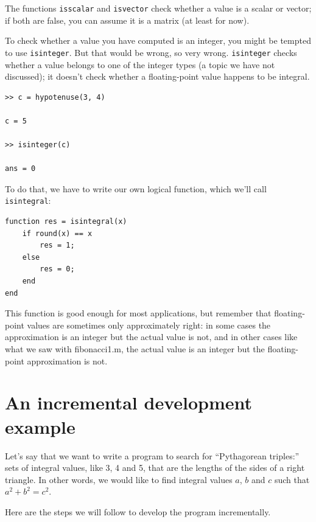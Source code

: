 \documentclass{book}
\begin{document}
The functions {\tt isscalar} and {\tt isvector} check whether
a value is a scalar or vector; if both are false, you can assume
it is a matrix (at least for now).

To check whether a value you have computed is an integer, you might
be tempted to use {\tt isinteger}.  But that would be wrong, so very
wrong.  {\tt isinteger} checks whether a value belongs to one of
the integer types (a topic we have not discussed); it doesn't check
whether a floating-point value happens to be integral.

\begin{verbatim}
>> c = hypotenuse(3, 4)

c = 5

>> isinteger(c)

ans = 0
\end{verbatim}

To do that, we have to write our own logical function, which
we'll call {\tt isintegral}:

\begin{verbatim}
function res = isintegral(x)
    if round(x) == x
        res = 1;
    else
        res = 0;
    end
end
\end{verbatim}

This function is good enough for most applications, but remember
that floating-point values are 
sometimes 
only approximately right: in some
cases the approximation is an integer but the actual
value is not, 
and in other cases like what we saw with fibonacci1.m,
the actual value is an integer but the floating-point
approximation is not.


\section{An incremental development example}
\label{increxample}

Let's say that we want to write a program to search for ``Pythagorean
triples:'' sets of integral values, like 3, 4 and 5,
that are the lengths of the sides of a right triangle.  In other
words, we would like to find integral values $a$, $b$ and $c$ such
that $a^2 + b^2 = c^2$.

Here are the steps we will follow to develop the program incrementally.
\end{document}
